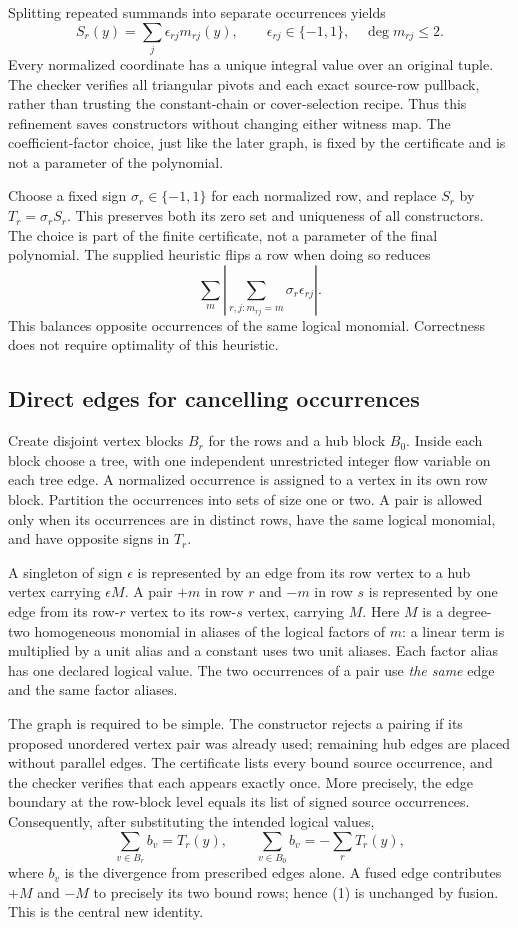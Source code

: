 Splitting repeated summands into separate occurrences yields
\[
 S_r(y)=\sum_j\epsilon_{rj}m_{rj}(y),\qquad \epsilon_{rj}\in\{-1,1\},
 \quad \deg m_{rj}\le2.
\]
Every normalized coordinate has a unique integral value over an original
tuple. The checker verifies all triangular pivots and each exact source-row
pullback, rather than trusting the constant-chain or cover-selection
recipe. Thus this refinement saves constructors without changing either
witness map. The coefficient-factor choice, just like the later graph,
is fixed by the certificate and is not a parameter of the polynomial.

Choose a fixed sign $\sigma_r\in\{-1,1\}$ for each normalized row, and
replace $S_r$ by $T_r=\sigma_rS_r$. This preserves both its zero set and
uniqueness of all constructors. The choice is part of the finite
certificate, not a parameter of the final polynomial. The supplied
heuristic flips a row when doing so reduces
\[
 \sum_m\left|\sum_{r,j:m_{rj}=m}\sigma_r\epsilon_{rj}\right|.
\]
This balances opposite occurrences of the same logical monomial.
Correctness does not require optimality of this heuristic.

\subsection{Direct edges for cancelling occurrences}
Create disjoint vertex blocks $B_r$ for the rows and a hub block $B_0$.
Inside each block choose a tree, with one independent unrestricted integer
flow variable on each tree edge. A normalized occurrence is assigned to a
vertex in its own row block. Partition the occurrences into sets of size
one or two. A pair is allowed only when its occurrences are in distinct
rows, have the same logical monomial, and have opposite signs in $T_r$.

A singleton of sign $\epsilon$ is represented by an edge from its row
vertex to a hub vertex carrying $\epsilon M$. A pair $+m$ in row $r$ and
$-m$ in row $s$ is represented by one edge from its row-$r$ vertex to its
row-$s$ vertex, carrying $M$. Here $M$ is a degree-two homogeneous
monomial in aliases of the logical factors of $m$: a linear term is
multiplied by a unit alias and a constant uses two unit aliases. Each factor
alias has one declared logical value. The two occurrences of a pair use
\emph{the same} edge and the same factor aliases.

The graph is required to be simple. The constructor rejects a pairing if
its proposed unordered vertex pair was already used; remaining hub edges
are placed without parallel edges. The certificate lists every bound
source occurrence, and the checker verifies that each appears exactly
once. More precisely, the edge boundary at the row-block level equals its
list of signed source occurrences. Consequently, after substituting the
intended logical values,
\[
 \sum_{v\in B_r} b_v=T_r(y),\qquad
 \sum_{v\in B_0} b_v=-\sum_rT_r(y),                 \tag{1}
\]
where $b_v$ is the divergence from prescribed edges alone. A fused edge
contributes $+M$ and $-M$ to precisely its two bound rows; hence (1) is
unchanged by fusion. This is the central new identity.

